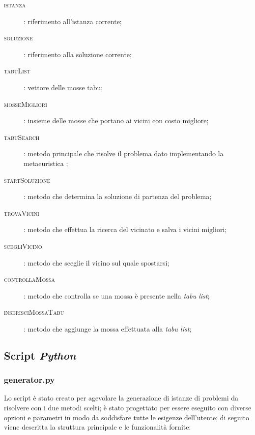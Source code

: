 \begin{description}
\begin{description}
		\item[\textsc{istanza}]: riferimento all'istanza corrente;
		\item[\textsc{soluzione}]: riferimento alla soluzione corrente;
		\item[\textsc{tabuList}]: vettore delle mosse tabu;
		\item[\textsc{mosseMigliori}]: insieme delle mosse che portano ai vicini con costo migliore;
		\item[\textsc{tabuSearch}]: metodo principale che risolve il problema dato implementando la metaeuristica \tabu;
		\item[\textsc{startSoluzione}]: metodo che determina la soluzione di partenza del problema;
		\item[\textsc{trovaVicini}]: metodo che effettua la ricerca del vicinato e salva i vicini migliori;
		\item[\textsc{scegliVicino}]: metodo che sceglie il vicino sul quale spostarsi;
		\item[\textsc{controllaMossa}]: metodo che controlla se una mossa è presente nella \emph{tabu list};
		\item[\textsc{inserisciMossaTabu}]: metodo che aggiunge la mossa effettuata alla \emph{tabu list};
	\end{description}
\end{description}





\subsection{Script \emph{Python}}
\subsubsection{generator.py}
Lo script  è stato creato per agevolare la generazione di istanze di problemi da risolvere con i due metodi scelti; è stato progettato per essere eseguito con diverse opzioni e parametri in modo da soddisfare tutte le esigenze dell'utente; di seguito viene descritta la struttura principale e le funzionalità fornite:

